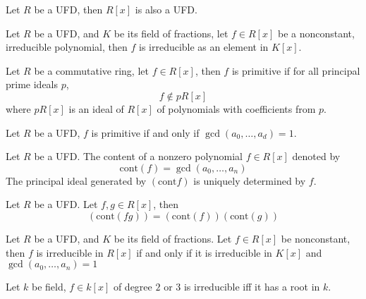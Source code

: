 \documentclass[openany]{book}
\begin{document}
\begin{thm}
    Let $R$ be a UFD, then $R[x]$ is also a UFD.
\end{thm}

\begin{prop}
    Let $R$ be a UFD, and $K$ be its field of fractions, let $f\in R[x]$ be a nonconstant, irreducible polynomial, then $f$ is irreducible as an element in $K[x]$.
\end{prop}



\begin{defn}
    Let $R$ be a commutative ring, let $f\in R[x]$, then $f$ is primitive if for all principal prime ideals $p$, 
    \begin{equation*}
        f\not\in pR[x]
    \end{equation*}
    where $pR[x]$ is an ideal of $R[x]$ of polynomials with coefficients from $p$.
\end{defn}

\begin{prop}[*]
    Let $R$ be a UFD, $f$ is primitive if and only if $\gcd(a_0,\dots, a_d)=1$.
\end{prop}

\begin{defn}
    Let $R$ be a UFD.
    The content of a nonzero polynomial $f\in R[x]$ denoted by 
    \begin{equation*}
        \text{cont}(f)=\gcd(a_0,\dots,a_n)
    \end{equation*}
    The principal ideal generated by $(\text{cont}f)$ is uniquely determined by $f$.
\end{defn}

\begin{prop}
    Let $R$ be a UFD. Let $f,g\in R[x]$, then 
    \begin{equation*}
        (\text{cont}(fg))=(\text{cont}(f))(\text{cont}(g))
    \end{equation*}
\end{prop}



\begin{prop}
    Let $R$ be a UFD, and $K$ be its field of fractions. Let $f\in R[x]$ be nonconstant, then $f$ is irreducible in $R[x]$ if and only if it is irreducible in $K[x]$ and $\gcd(a_0,\dots, a_n)=1$ 
\end{prop}

\begin{prop}
    Let $k$ be field, $f\in k[x]$ of degree $2$ or $3$ is irreducible iff it has a root in $k$.
\end{prop}
\end{document}

